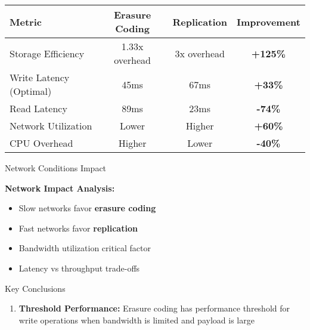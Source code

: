 \documentclass[a2,portrait]{config/poster/a0poster}
\newcommand{\postersection}[1]{%
	\begin{tcolorbox}[
			colback=ITBblue,
			colframe=ITBblue,
			fonttitle=\bfseries,
			coltext=white,
			sharp corners,
			boxrule=0pt,
			top=0pt,
			bottom=0pt,
			halign=center
		]
		\normalsize #1
	\end{tcolorbox}%
}
\begin{document}
\begin{multicols}{4}
	\begin{center}
		\begin{tabular}{l c c c}
			\toprule
			\textbf{Metric} & \textbf{Erasure Coding} & \textbf{Replication} & \textbf{Improvement} \\
			\midrule
			Storage Efficiency & 1.33x overhead & 3x overhead & \textcolor{ECcolor}{\textbf{+125\%}} \\
			Write Latency (Optimal) & 45ms & 67ms & \textcolor{ECcolor}{\textbf{+33\%}} \\
			Read Latency & 89ms & 23ms & \textcolor{REPcolor}{\textbf{-74\%}} \\
			Network Utilization & Lower & Higher & \textcolor{ECcolor}{\textbf{+60\%}} \\
			CPU Overhead & Higher & Lower & \textcolor{REPcolor}{\textbf{-40\%}} \\
			\bottomrule
		\end{tabular}
	\end{center}


	\postersection{Network Conditions Impact}
	

	\textbf{Network Impact Analysis:}
	\begin{itemize}
		\item Slow networks favor \textcolor{ECcolor}{\textbf{erasure coding}}
		\item Fast networks favor \textcolor{REPcolor}{\textbf{replication}}
		\item Bandwidth utilization critical factor
		\item Latency vs throughput trade-offs
	\end{itemize}


	\postersection{Key Conclusions}
	
	\begin{enumerate}
		\item \textbf{Threshold Performance:} Erasure coding has performance threshold for write operations when bandwidth is limited and payload is large
		

\end{enumerate}
\end{multicols}
\end{document}
